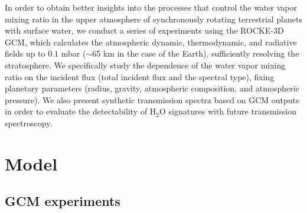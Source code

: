 \documentclass[11pt,numberedappendix,twocolappendix,]{emulateapj}
\def\water{H$_2$O}
\def\modelE{ROCKE-3D}
\def\wv{water vapor}
\begin{document}

In order to obtain better insights into the processes that control the \wv{}  mixing ratio in the upper atmosphere of synchronously rotating terrestrial planets with surface water, we conduct a series of experiments using the \modelE{} GCM, which calculates the atmospheric dynamic, thermodynamic, and radiative fields up to $0.1$ mbar ($\sim $65 km in the case of the Earth), sufficiently resolving the stratosphere. 
We specifically study the dependence of the \wv{} mixing ratio on the incident flux (total incident flux and the spectral type), fixing planetary parameters (radius, gravity, atmospheric composition, and atmospheric pressure). 
We also present synthetic transmission spectra based on GCM outputs in order to evaluate the detectability of \water{} signatures with future transmission spectroscopy. 



\section{Model}
\label{s:model}

\subsection{GCM experiments}
\end{document}
